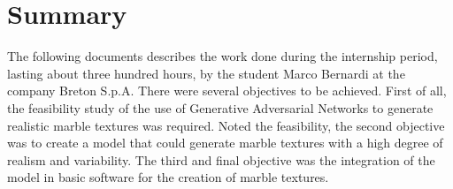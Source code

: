 \cleardoublepage{}
\begingroup
\let\clearpage\relax
\let\cleardoublepage\relax
\let\cleardoublepage\relax

\chapter*{Summary}
The following documents describes the work done during the internship period, lasting about three hundred hours, by the student Marco Bernardi at the company Breton S.p.A.
There were several objectives to be achieved.
First of all, the feasibility study of the use of Generative Adversarial Networks to generate realistic marble textures was required.
Noted the feasibility, the second objective was to create a model that could generate marble textures with a high degree of realism and variability.
The third and final objective was the integration of the model in basic software for the creation of marble textures.




\endgroup

\vfill

